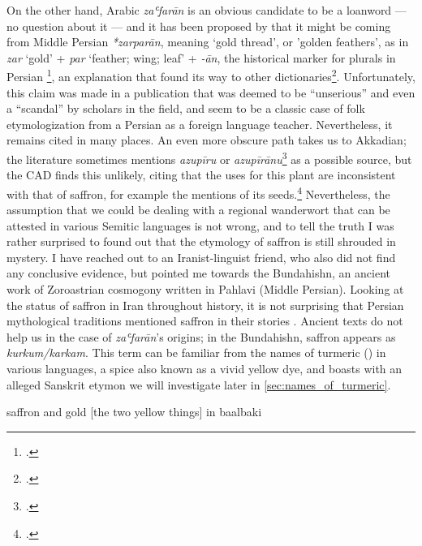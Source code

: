 On the other hand, Arabic \textit{zaʿfarān} is an obvious candidate to be a loanword --- no question about it --- and it has been proposed by \textcite{asbaghi_persische_1988} that it might be coming from Middle Persian \textit{*zarparān}, meaning `gold thread', or 'golden feathers', as in \textit{zar} `gold' + \textit{par} `feather; wing; leaf' + \textit{-ān}, the historical marker for plurals in Persian \footcite[65,98]{mackenzie_concise_1986}, an explanation that found its way to other dictionaries\footcite[cf.][safran]{ns}. Unfortunately, this claim was made in a publication that was deemed to be ``unserious'' \autocite[9]{ullmann_zur_1997} and even a ``scandal'' \autocite[315]{niehoff_review_1989} by scholars in the field, and seem to be a classic case of folk etymologization from a Persian as a foreign language teacher. Nevertheless, it remains cited in many places. An even more obscure path takes us to Akkadian; the literature sometimes mentions \textit{azupīru} or \textit{azupīrānu}\footcite[33]{black_concise_2000} as a possible source, but the \gls{CAD} finds this unlikely, citing that the uses for this plant are inconsistent with that of saffron, for example the mentions of its seeds.\footcite[531]{roth_assyrian_2004} 
Nevertheless, the assumption that we could be dealing with a regional \gls{wanderwort} that can be attested in various Semitic languages is not wrong, and to tell the truth I was rather surprised to found out that the etymology of saffron is still shrouded in mystery. I have reached out to an Iranist-linguist friend, who also did not find any conclusive evidence, but pointed me towards the Bundahishn, an ancient work of Zoroastrian cosmogony written in Pahlavi (Middle Persian). Looking at the status of saffron in Iran throughout history, it is not surprising that Persian mythological traditions mentioned saffron in their stories \autocite{sharifi_etymology_2010, golfam_saffron_2017}. Ancient texts do not help us in the case of \textit{zaʿfarān}'s origins; in the Bundahishn, saffron appears as \textit{kurkum/karkam}. This term can be familiar from the names of turmeric () in various languages, a spice also known as a vivid yellow dye, and boasts with an alleged Sanskrit etymon we will investigate later in \cref{sec:names_of_turmeric}.

 saffron and gold [the two yellow things] in baalbaki





